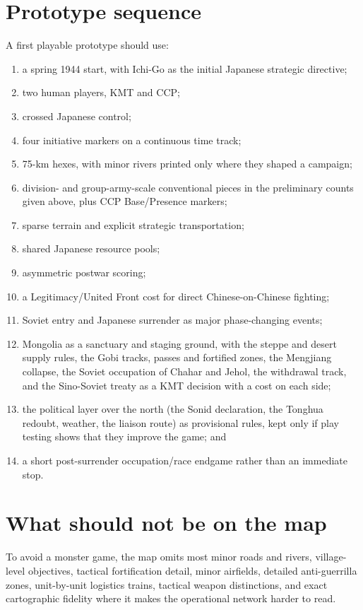 \documentclass[11pt]{article}
\begin{document}
\section{Prototype sequence}
A first playable prototype should use:
\begin{enumerate}
\item a spring 1944 start, with Ichi-Go as the initial Japanese strategic directive;
\item two human players, KMT and CCP;
\item crossed Japanese control;
\item four initiative markers on a continuous time track;
\item 75-km hexes, with minor rivers printed only where they shaped a campaign;
\item division- and group-army-scale conventional pieces in the preliminary counts given above, plus CCP Base/Presence markers;
\item sparse terrain and explicit strategic transportation;
\item shared Japanese resource pools;
\item asymmetric postwar scoring;
\item a Legitimacy/United Front cost for direct Chinese-on-Chinese fighting;
\item Soviet entry and Japanese surrender as major phase-changing events;
\item Mongolia as a sanctuary and staging ground, with the steppe and desert supply rules, the Gobi tracks, passes and fortified zones, the Mengjiang collapse, the Soviet occupation of Chahar and Jehol, the withdrawal track, and the Sino-Soviet treaty as a KMT decision with a cost on each side;
\item the political layer over the north (the Sonid declaration, the Tonghua redoubt, weather, the liaison route) as provisional rules, kept only if play testing shows that they improve the game; and
\item a short post-surrender occupation/race endgame rather than an immediate stop.
\end{enumerate}

\section{What should not be on the map}
To avoid a monster game, the map omits most minor roads and rivers, village-level objectives, tactical fortification detail, minor airfields, detailed anti-guerrilla zones, unit-by-unit logistics trains, tactical weapon distinctions, and exact cartographic fidelity where it makes the operational network harder to read.
\end{document}
